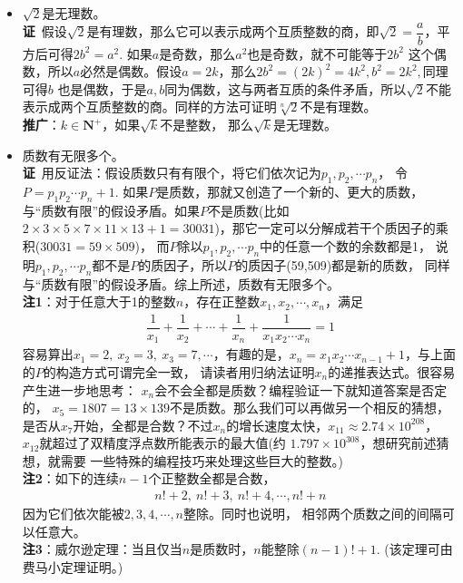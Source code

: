 \begin{itemize}[leftmargin=\inteval{\myitemleftmargin}pt,itemsep=
   \inteval{\myitemitempsep}pt,topsep=\inteval{\myitemtopsep}pt]
\item $ \sqrt{2} $是无理数。\\
\textbf{证}\ 假设$ \sqrt{2} $是有理数，那么它可以表示成两个互质整数的商，即$ \sqrt{2}=
\dfrac{a}{b} $，平方后可得$ 2b^2=a^2 $. 如果$ a $是奇数，那么$ a^2 $也是奇数，就不可能等于$ 2b^2 $
这个偶数，所以$ a $必然是偶数。假设$ a=2k $，那么$ 2b^2=(2k)^2=4k^2,b^2=2k^2, $同理可得$ b $
也是偶数，于是$ a,b $同为偶数，这与两者互质的条件矛盾，所以$ \sqrt{2} $不能表示成两个互质整数的商。同样的方法可证明$ \sqrt[n]{2} $不是有理数。\\
\textbf{推广}：$ k\in \textbf{N}^+ $，如果$ \sqrt{k} $不是整数，
那么$ \sqrt{k} $是无理数。

\item 质数有无限多个。\\
\textbf{证}\ 用反证法：假设质数只有有限个，将它们依次记为$ p_1,p_2,\cdots p_n $，
令$ P=p_1p_2\cdots p_n+1 $. 如果$ P $是质数，那就又创造了一个新的、更大的质数，
与“质数有限”的假设矛盾。如果$ P $不是质数(比如$ 2\times 3\times 5\times 7\times 11\times 13+1=30031 $)，那它一定可以分解成若干个质因子的乘积($ 30031=59\times 509 $)，
而$ P $除以$ p_1,p_2,\cdots p_n $中的任意一个数的余数都是1，
说明$ p_1,p_2,\cdots p_n $都不是$ P $的质因子，所以$ P $的质因子(59,509)都是新的质数，
同样与“质数有限”的假设矛盾。综上所述，质数有无限多个。\\
\textbf{注1}：对于任意大于1的整数$ n $，存在正整数$ x_1,x_2,\cdots,
x_n $，满足
\begin{align*}
    \dfrac{1}{x_1}+\dfrac{1}{x_2}+\cdots+\dfrac{1}{x_n}+
    \dfrac{1}{x_1x_2\cdots x_n}=1
\end{align*}
容易算出$ x_1=2,\ x_2=3,\ x_3=7,\cdots $，有趣的是，$ x_n=
x_1x_2\cdots x_{n-1}+1 $，与上面的$ P $的构造方式可谓完全一致，
请读者用归纳法证明$ x_n $的递推表达式。很容易产生进一步地思考：
$ x_n $会不会全都是质数？编程验证一下就知道答案是否定的，
$ x_5=1807=13\times 139 $不是质数。那么我们可以再做另一个相反的猜想，是否从$ x_7 $开始，全都是合数？不过$ x_n $的增长速度太快，$ x_{11}\approx 2.74\times 10^{208} $，
$ x_{12} $就超过了双精度浮点数所能表示的最大值(约
$ 1.797\times 10^{308} $，想研究前述猜想，就需要
一些特殊的编程技巧来处理这些巨大的整数。)\\
\textbf{注2}：如下的连续$ n-1 $个正整数全都是合数，
\begin{align*}
    n!+2,\ n!+3,\ n!+4,\cdots,n!+n
\end{align*}
因为它们依次能被$ 2,3,4,\cdots,n $整除。同时也说明，
相邻两个质数之间的间隔可以任意大。 \\
\textbf{注3}：威尔逊定理：当且仅当$ n $是质数时，$ n $能整除$ (n-1)!+1 $. (该定理可由费马小定理证明。) 


\end{itemize}
